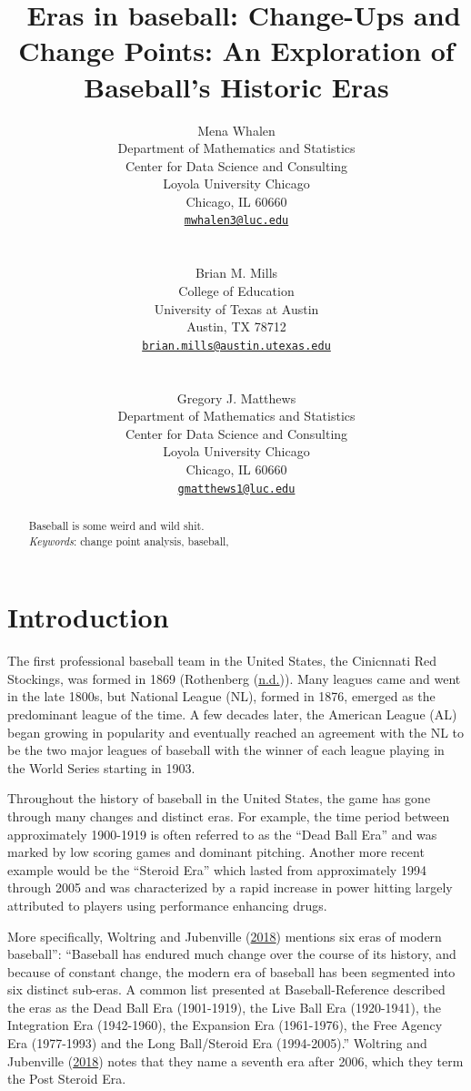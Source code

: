 \documentclass[
  12pt,
]{article}
\title{~\Large Eras in baseball: Change-Ups and Change Points: An
Exploration of Baseball's Historic Eras}
\author{\large Mena Whalen \vspace{-1.1mm}\\
\normalsize Department of Mathematics and Statistics \vspace{-1mm}\\
\normalsize Center for Data Science and Consulting \vspace{-1mm}\\
\normalsize Loyola University Chicago \vspace{-1mm}\\
\normalsize Chicago, IL 60660 \vspace{-1mm}\\
\normalsize \href{mailto:mwhalen3@luc.edu}{\texttt{mwhalen3@luc.edu}}
\vspace{-1mm}\\
\strut \\
\large Brian M. Mills \vspace{-1.1mm}\\
\normalsize College of Education \vspace{-1mm}\\
\normalsize University of Texas at Austin \vspace{-1mm}\\
\normalsize Austin, TX 78712 \vspace{-1mm}\\
\normalsize \href{mailto:brian.mills@austin.utexas.edu}{\texttt{brian.mills@austin.utexas.edu}}
\vspace{-1mm}\\
\strut \\
\large Gregory J. Matthews \vspace{-1.1mm}\\
\normalsize Department of Mathematics and Statistics \vspace{-1mm}\\
\normalsize Center for Data Science and Consulting \vspace{-1mm}\\
\normalsize Loyola University Chicago \vspace{-1mm}\\
\normalsize Chicago, IL 60660 \vspace{-1mm}\\
\normalsize \href{mailto:gmatthews1@luc.edu}{\texttt{gmatthews1@luc.edu}}
\vspace{-1mm}}
\date{}
\begin{document}
\maketitle
\begin{abstract}
Baseball is some weird and wild shit. \vspace{2mm}\\
\emph{Keywords}: change point analysis, baseball,
\end{abstract}

\newpage

\hypertarget{sec:intro}{%
\section{Introduction}\label{sec:intro}}

The first professional baseball team in the United States, the
Cinicnnati Red Stockings, was formed in 1869 (Rothenberg
(\protect\hyperlink{ref-BBHOF1869}{n.d.})). Many leagues came and went
in the late 1800s, but National League (NL), formed in 1876, emerged as
the predominant league of the time. A few decades later, the American
League (AL) began growing in popularity and eventually reached an
agreement with the NL to be the two major leagues of baseball with the
winner of each league playing in the World Series starting in 1903.

Throughout the history of baseball in the United States, the game has
gone through many changes and distinct eras. For example, the time
period between approximately 1900-1919 is often referred to as the
``Dead Ball Era'' and was marked by low scoring games and dominant
pitching. Another more recent example would be the ``Steroid Era'' which
lasted from approximately 1994 through 2005 and was characterized by a
rapid increase in power hitting largely attributed to players using
performance enhancing drugs.

More specifically, Woltring and Jubenville
(\protect\hyperlink{ref-Woltring2018}{2018}) mentions six eras of modern
baseball'': ``Baseball has endured much change over the course of its
history, and because of constant change, the modern era of baseball has
been segmented into six distinct sub-eras. A common list presented at
Baseball-Reference described the eras as the Dead Ball Era (1901-1919),
the Live Ball Era (1920-1941), the Integration Era (1942-1960), the
Expansion Era (1961-1976), the Free Agency Era (1977-1993) and the Long
Ball/Steroid Era (1994-2005).'' Woltring and Jubenville
(\protect\hyperlink{ref-Woltring2018}{2018}) notes that they name a
seventh era after 2006, which they term the Post Steroid Era.
\end{document}
